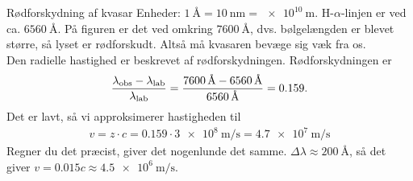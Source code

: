 \documentclass[crop=false, class=memoir]{standalone}
\begin{document}
\begin{opgave}{Rødforskydning af kvasar}
	\opg Enheder: $\SI{1}{\angstrom} = \SI{10}{\nano\meter} = \SI{e10}{\meter}$. H-$\alpha$-linjen er ved ca. $\SI{6560}{\angstrom}$. På figuren er det ved omkring $\SI{7600}{\angstrom}$, dvs. bølgelængden er blevet større, så lyset er rødforskudt. Altså må kvasaren bevæge sig væk fra os.\\
	\opg Den radielle hastighed er beskrevet af rødforskydningen. Rødforskydningen er
	\begin{align}
		\frac{\lambda_\textup{obs}-\lambda_\textup{lab}}{\lambda_\textup{lab}} = \frac{\SI{7600}{\angstrom} - \SI{6560}{\angstrom}}{\SI{6560}{\angstrom}} = \num{0,159}.
	\end{align}
	Det er lavt, så vi approksimerer hastigheden til
	\begin{align}
		v= z\cdot c = \num{0,159} \cdot \SI{3e8}{\meter\per\second} = \SI{4,7e7}{\meter\per\second}
	\end{align}
	Regner du det præcist, giver det nogenlunde det samme.
	\opg $\Delta\lambda \approx \SI{200}{\angstrom}$, så det giver $v = \num{0.015} c \approx \SI{4,5e6}{\meter\per\second}$.
\end{opgave}
\end{document}
